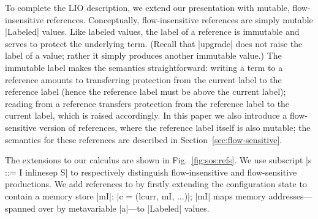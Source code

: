 To complete the LIO description, we extend our \lio{} presentation with
mutable, flow-insensitive references.
%
Conceptually, flow-insensitive references are simply mutable |Labeled| values.
%
Like labeled values, the label of a reference is immutable and serves to
protect the underlying term.
%
(Recall that |upgrade| does not raise the label of a value; rather it simply
produces another immutable value.)
%
The immutable label makes the semantics straightforward: writing a term to a
reference amounts to transferring protection from the current label to the
reference label (hence the reference label must be above the current label);
reading from a reference transfers protection from the reference label to the
current label, which is raised accordingly.
%
In this paper we also introduce a flow-sensitive version of
references, where the reference label itself is also mutable; the
semantics for these references are described in
Section~\ref{sec:flow-sensitive}.

%
The extensions to our calculus are shown in Fig.~\ref{fig:sos:refs}.
%
We use subscript |s ::= I inlinesep S| to respectively distinguish
flow-insensitive and flow-sensitive productions.
%
We add references to \lio{} by firstly extending the configuration state to
contain a memory store |mI|: |c = (lcurr, mI, ...)|;
%
|mI| maps memory addresses---spanned over by metavariable |a|---to |Labeled|
values.
%
%

